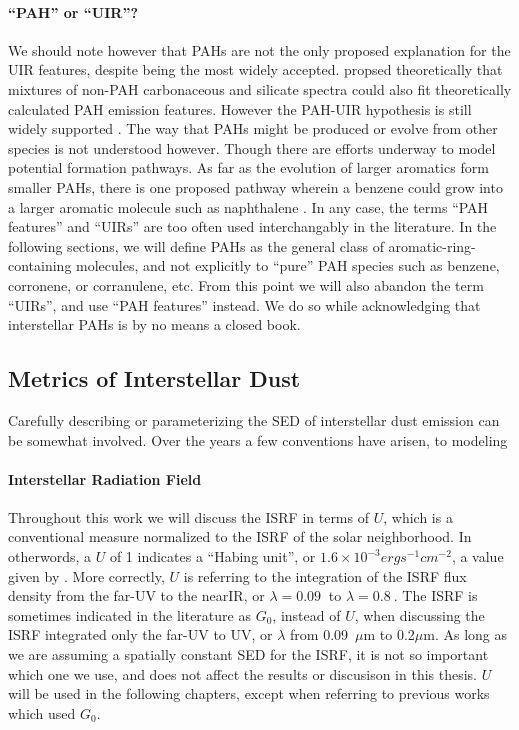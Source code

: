     \paragraph{``PAH'' or ``UIR''?}
      We should note however that PAHs are not the only proposed explanation for the UIR features, despite being the most widely accepted. \cite{zhang14} propsed theoretically that mixtures of non-PAH carbonaceous and silicate spectra could also fit theoretically calculated PAH emission features. However the PAH-UIR hypothesis is still widely supported \citep{tielens08,rastogi13}.  The way that PAHs might be produced or evolve from other species is not understood however. Though there are efforts underway to model potential formation pathways. As far as the evolution of larger aromatics form smaller PAHs, there is one proposed pathway wherein a benzene could grow into a larger aromatic molecule such as naphthalene \citep{ghesquiere14}. In any case, the terms ``PAH features'' and ``UIRs'' are too often used interchangably in the literature. In the following sections, we will define PAHs as the general class of aromatic-ring-containing molecules, and not explicitly to ``pure'' PAH species such as benzene, corronene, or corranulene, etc. From this point we will also abandon the term ``UIRs'', and use ``PAH features'' instead. We do so while acknowledging that interstellar PAHs is by no means a closed book.



     \subsection{Metrics of Interstellar Dust}
      Carefully describing or parameterizing the SED of interstellar dust emission can be somewhat involved. Over the years a few conventions have arisen, to modeling

      \paragraph{Interstellar Radiation Field}
      Throughout this work we will discuss the ISRF in terms of $U$, which is a conventional measure normalized to the ISRF of the solar neighborhood. In otherwords, a $U$ of 1 indicates a ``Habing unit'', or $1.6\times{}10^{-3} erg s^{-1} cm^{-2}$, a value given by \cite{habing68}. More correctly, $U$ is referring to the integration of the ISRF flux density from the far-UV to the nearIR, or $\lambda =0.09~$ to $\lambda =0.8~$.  The ISRF is sometimes indicated in the literature as $G_0$, instead of $U$, when discussing the ISRF integrated only the far-UV to UV, or $\lambda$ from 0.09~$\mu$m to 0.2$\mu$m. As long as we are assuming a spatially constant SED for the ISRF, it is not so important which one we use, and does not affect the results or discusison in this thesis. $U$ will be used in the following chapters, except when referring to previous works which used $G_0$.

